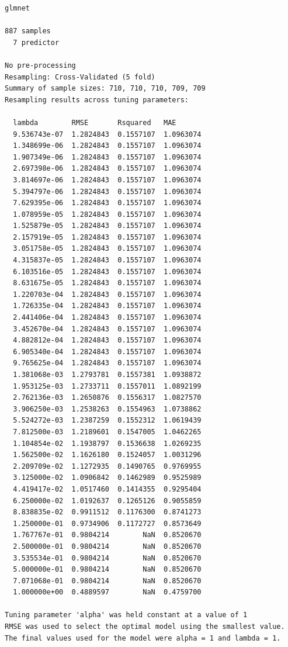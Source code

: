 \documentclass[
  letterpaper,
  DIV=11,
  numbers=noendperiod]{scrartcl}
\begin{document}
\begin{verbatim}
glmnet 

887 samples
  7 predictor

No pre-processing
Resampling: Cross-Validated (5 fold) 
Summary of sample sizes: 710, 710, 710, 709, 709 
Resampling results across tuning parameters:

  lambda        RMSE       Rsquared   MAE      
  9.536743e-07  1.2824843  0.1557107  1.0963074
  1.348699e-06  1.2824843  0.1557107  1.0963074
  1.907349e-06  1.2824843  0.1557107  1.0963074
  2.697398e-06  1.2824843  0.1557107  1.0963074
  3.814697e-06  1.2824843  0.1557107  1.0963074
  5.394797e-06  1.2824843  0.1557107  1.0963074
  7.629395e-06  1.2824843  0.1557107  1.0963074
  1.078959e-05  1.2824843  0.1557107  1.0963074
  1.525879e-05  1.2824843  0.1557107  1.0963074
  2.157919e-05  1.2824843  0.1557107  1.0963074
  3.051758e-05  1.2824843  0.1557107  1.0963074
  4.315837e-05  1.2824843  0.1557107  1.0963074
  6.103516e-05  1.2824843  0.1557107  1.0963074
  8.631675e-05  1.2824843  0.1557107  1.0963074
  1.220703e-04  1.2824843  0.1557107  1.0963074
  1.726335e-04  1.2824843  0.1557107  1.0963074
  2.441406e-04  1.2824843  0.1557107  1.0963074
  3.452670e-04  1.2824843  0.1557107  1.0963074
  4.882812e-04  1.2824843  0.1557107  1.0963074
  6.905340e-04  1.2824843  0.1557107  1.0963074
  9.765625e-04  1.2824843  0.1557107  1.0963074
  1.381068e-03  1.2793781  0.1557381  1.0938872
  1.953125e-03  1.2733711  0.1557011  1.0892199
  2.762136e-03  1.2650876  0.1556317  1.0827570
  3.906250e-03  1.2538263  0.1554963  1.0738862
  5.524272e-03  1.2387259  0.1552312  1.0619439
  7.812500e-03  1.2189601  0.1547005  1.0462265
  1.104854e-02  1.1938797  0.1536638  1.0269235
  1.562500e-02  1.1626180  0.1524057  1.0031296
  2.209709e-02  1.1272935  0.1490765  0.9769955
  3.125000e-02  1.0906842  0.1462989  0.9525989
  4.419417e-02  1.0517460  0.1414355  0.9295404
  6.250000e-02  1.0192637  0.1265126  0.9055859
  8.838835e-02  0.9911512  0.1176300  0.8741273
  1.250000e-01  0.9734906  0.1172727  0.8573649
  1.767767e-01  0.9804214        NaN  0.8520670
  2.500000e-01  0.9804214        NaN  0.8520670
  3.535534e-01  0.9804214        NaN  0.8520670
  5.000000e-01  0.9804214        NaN  0.8520670
  7.071068e-01  0.9804214        NaN  0.8520670
  1.000000e+00  0.4889597        NaN  0.4759700

Tuning parameter 'alpha' was held constant at a value of 1
RMSE was used to select the optimal model using the smallest value.
The final values used for the model were alpha = 1 and lambda = 1.
\end{verbatim}
\end{document}
